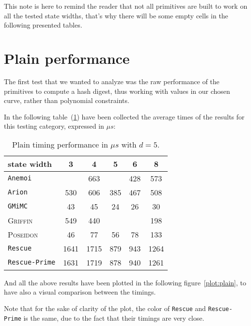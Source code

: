 \documentclass[12pt, a4paper]{report}
\begin{document}
\begin{note}
  This note is here to remind the reader that not all primitives are built to work on all the tested state widths, that's why there will be some empty cells in the following presented tables.
\end{note}

\section{Plain performance}\label{sec:plain}

The first test that we wanted to analyze was the raw performance of the primitives to compute a hash digest, thus working with values in our chosen curve, rather than polynomial constraints.

In the following table~(\ref{tab:plain}) have been collected the average times of the results for this testing category, expressed in $\mu s$:

\begin{table}[H]
  \caption{Plain timing performance in $\mu s$ with $d = 5$.}\label{tab:plain}
  \begin{center}
    \begin{tabular}{|l|c|c|c|c|c|}
      \hline
        state width & 3 & 4 & 5 & 6 & 8 \\
      \hline
        \texttt{Anemoi} & & 663 &  & 428 & 573 \\
        \texttt{Arion} & 530 & 606 & 385 & 467 & 508 \\
        \texttt{GMiMC} & 43 & 45 & \cellcolor{green!35} 24 & 26 & 30 \\
        \textsc{Griffin} & 549 & 440 & & & 198 \\
        \textsc{Poseidon} & 46 & 77 & 56 & 78 & 133 \\
        \texttt{Rescue} & \cellcolor{orange!35} 1641 & \cellcolor{orange!35} 1715 & 879 & 943 & \cellcolor{orange!35} 1264 \\
        \texttt{Rescue-Prime} & \cellcolor{orange!35} 1631 & \cellcolor{red!35} 1719 & 878 & 940 &  \cellcolor{orange!35} 1261 \\
      \hline
    \end{tabular}
  \end{center}
\end{table}

And all the above results have been plotted in the following figure~\ref{plot:plain}, to have also a visual comparison between the timings.

Note that for the sake of clarity of the plot, the color of \texttt{Rescue} and \texttt{Rescue-Prime} is the same, due to the fact that their timings are very close.
\end{document}
